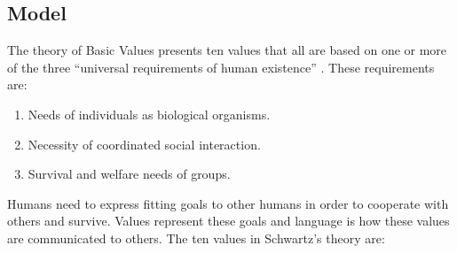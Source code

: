 \subsection{Model}
The theory of Basic Values presents ten values that all are based on one or more of the three ``universal requirements of human existence'' \citep{schwartz2012overview}. These requirements are:

\begin{enumerate}
    \item Needs of individuals as biological organisms.
    \item Necessity of coordinated social interaction.
    \item Survival and welfare needs of groups.
\end{enumerate}

Humans need to express fitting goals to other humans in order to cooperate with others and survive. Values represent these goals and language is how these values are communicated to others. The ten values in Schwartz’s theory are:

